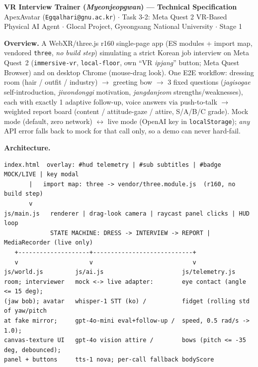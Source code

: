 \documentclass[10pt,a4paper]{article}
\begin{document}
\begin{center}
{\large\bfseries VR Interview Trainer (\emph{Myeonjeopgwan}) --- Technical Specification}\\[1pt]
{\footnotesize ApexAvatar (\texttt{Egqalhari@gnu.ac.kr}) \;$\cdot$\; Task 3-2: Meta Quest 2 VR-Based Physical AI Agent \;$\cdot$\; Glocal Project, Gyeongsang National University \;$\cdot$\; Stage 1}
\end{center}
\vspace{-2pt}

\textbf{Overview.} A WebXR/three.js r160 single-page app (ES modules + import map, vendored \texttt{three}, \emph{no build step}) simulating a strict Korean job interview on Meta Quest~2 (\texttt{immersive-vr}, \texttt{local-floor}, own ``VR \emph{ipjang}'' button; Meta Quest Browser) and on desktop Chrome (mouse-drag look). One E2E workflow: dressing room (hair / outfit / industry) $\rightarrow$ greeting bow $\rightarrow$ 3 fixed questions (\emph{jagisogae} self-introduction, \emph{jiwondonggi} motivation, \emph{jangdanjeom} strengths/weaknesses), each with exactly 1 adaptive follow-up, voice answers via push-to-talk $\rightarrow$ weighted report board (content / attitude-gaze / attire, S/A/B/C grade). Mock mode (default, zero network) $\leftrightarrow$ live mode (OpenAI key in \texttt{localStorage}); \emph{any} API error falls back to mock for that call only, so a demo can never hard-fail.

\textbf{Architecture.}
{\footnotesize
\begin{verbatim}
index.html  overlay: #hud telemetry | #sub subtitles | #badge MOCK/LIVE | key modal
       |   import map: three -> vendor/three.module.js  (r160, no build step)
       v
js/main.js   renderer | drag-look camera | raycast panel clicks | HUD loop
             STATE MACHINE: DRESS -> INTERVIEW -> REPORT | MediaRecorder (live only)
   +--------------------+----------------------------+
   v                    v                            v
js/world.js         js/ai.js                      js/telemetry.js
room; interviewer   mock <-> live adapter:        eye contact (angle <= 15 deg);
(jaw bob); avatar   whisper-1 STT (ko) /          fidget (rolling std of yaw/pitch
at fake mirror;     gpt-4o-mini eval+follow-up /  speed, 0.5 rad/s -> 1.0);
canvas-texture UI   gpt-4o vision attire /        bows (pitch <= -35 deg, debounced);
panel + buttons     tts-1 nova; per-call fallback bodyScore
\end{verbatim}}
\vspace{-4pt}
\end{document}
